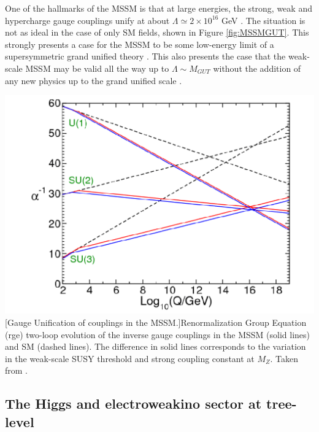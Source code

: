 One of the hallmarks of the MSSM is that at large energies, the strong, weak and hypercharge gauge couplings unify at about $\Lambda \simeq 2\times10^{16}$ GeV \cite{RN523} . The situation is not as ideal in the case of only SM fields, shown in Figure \ref{fig:MSSMGUT}. This strongly presents a case for the MSSM to be some low-energy limit of a supersymmetric grand unified theory \cite{RN524,RN525}. This also presents the case that the weak-scale MSSM may be valid all the way up to $\Lambda \sim M_{GUT}$ without the addition of any new physics up to the grand unified scale \cite{RN526}.
\begin{center}
\includegraphics[width=0.7\linewidth]{figures/MSSMGUT.pdf}
[Gauge Unification of couplings in the MSSM.]{Renormalization Group Equation (\acrshort{rge}) two-loop evolution of the inverse gauge couplings in the MSSM (solid lines) and SM (dashed lines). The difference in solid lines corresponds to the variation in the weak-scale SUSY threshold and strong coupling constant at $M_Z$. Taken from \cite{RN75}.}
\label{fig:MSSMGUT}
\end{center}

\subsection{The Higgs and electroweakino sector at tree-level}
\label{subsec:MSSMhiggssector}

